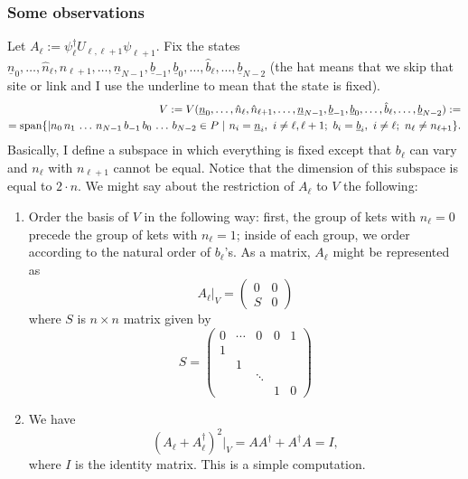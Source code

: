 \subsubsection{Some observations}
\begin{statement}
Let $A_{\ell} := \psi_\ell^\dagger U_{\ell,\ell+1} \psi_{\ell+1}$. Fix the states $\underline{n}_0,\ldots,\hat{n}_{\ell},\hat{n}_{\ell+1},\ldots,\underline{n}_{N-1},\underline{b}_{-1},\underline{b}_0,\ldots,\hat{b}_{\ell},\ldots,\underline{b}_{N-2}$ (the hat means that we skip that site or link and I use the underline to mean that the state is fixed).
\[\begin{split}
V:=V(\underline{n}_0,\ldots,\hat{n}_{\ell},\hat{n}_{\ell+1},\ldots,\underline{n}_{N-1},\underline{b}_{-1},\underline{b}_0,\ldots,\hat{b}_{\ell},\ldots,\underline{b}_{N-2}) :=\\= \operatorname{span} \{ |n_0\, n_1\, \ldots\, n_{N-1}\, b_{-1}\, b_0\, \ldots\, b_{N-2} \in P \ | \ n_i = \underline{n}_i, \ i \neq \ell, \ell+1; \ b_i = \underline{b}_{i}, \ i \neq \ell; \ n_{\ell} \neq n_{\ell+1}  \}.
\end{split}
\]
Basically, I define a subspace in which everything is fixed except that $b_{\ell}$ can vary and $n_{\ell}$ with $n_{\ell+1}$ cannot be equal. Notice that the dimension of this subspace is equal to $2\cdot n$. We might say about the restriction of $A_{\ell}$ to $V$ the following:
\begin{enumerate}[1)]
\item Order the basis of $V$ in the following way: first, the group of kets with $n_{\ell} = 0$ precede the group of kets with $n_{\ell} = 1$; inside of each group, we order according to the natural order of $b_{\ell}$'s. As a matrix, $A_{\ell}$ might be represented as
\[
A_{\ell}|_V = \begin{pmatrix}
0 & 0 \\
S & 0
\end{pmatrix}
\]
where $S$ is $n \times n$ matrix given by
\[
S = \begin{pmatrix}
0 & \cdots & 0 &0 & 1\\
1 & & & &\\
& 1 & & &\\
& & \ddots && \\
& & & 1 & 0
\end{pmatrix}
\]
\item We have
\[
(A_{\ell} + A_{\ell}^\dagger)^2|_V = AA^\dagger + A^\dagger A= I,
\]
where $I$ is the identity matrix. This is a simple computation.
\end{enumerate}
\end{statement}
%
